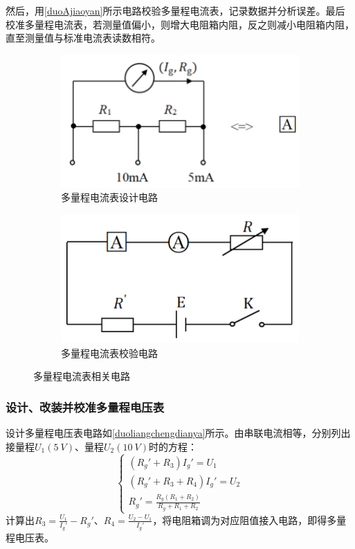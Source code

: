 \documentclass{../template/Preport}
\begin{document}
    然后，用\autoref{duoAjiaoyan}所示电路校验多量程电流表，记录数据并分析误差。最后校准多量程电流表，若测量值偏小，则增大电阻箱内阻，反之则减小电阻箱内阻，直至测量值与标准电流表读数相符。
    \begin{figure}[htbp]
        \centering
        \begin{subfigure}[b]{0.45\textwidth}
            \includegraphics[width=\textwidth]{figures/duoliangchengdianliu.png}
            \caption{多量程电流表设计电路}
            \label{duoliangchengdianliu}
        \end{subfigure}
        \hfill
        \begin{subfigure}[b]{0.45\textwidth}
            \includegraphics[width=\textwidth]{figures/duoAjiaoyan.png}
            \caption{多量程电流表校验电路}
            \label{duoAjiaoyan}
        \end{subfigure}
    \caption{多量程电流表相关电路}
    \end{figure}

\subsubsection{设计、改装并校准多量程电压表}
    设计多量程电压表电路如\autoref{duoliangchengdianya}所示。由串联电流相等，分别列出接量程$U_1(\SI{5}{V})$、量程$U_2(\SI{10}{V})$时的方程：
    \begin{equation}
        \begin{cases}
            (R_g'+R_3)I_g' = U_1\\
            (R_g'+R_3+R_4)I_g' = U_2\\
            R_g' = \frac{R_g(R_1+R_2)}{R_g+R_1+R_2}
        \end{cases}
    \end{equation}
    计算出$R_3=\frac{U_1}{I_g'}-R_g'$、$R_4 = \frac{U_2-U_1}{I_g'}$，将电阻箱调为对应阻值接入电路，即得多量程电压表。
\end{document}
